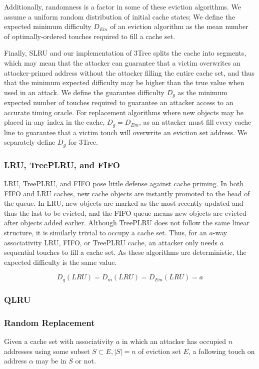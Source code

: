 \documentclass[sigconf, screen, review]{acmart}
\begin{document}
Additionally, randomness is a factor in some of these eviction algorithms.
We assume a uniform random distribution of initial cache states;
We define the expected minimum difficulty $D_{Em}$ of an eviction algorithm
as the mean number of optimally-ordered touches required to fill a cache set.

Finally, SLRU and our implementation of 3Tree splits the cache into segments,
which may mean that the attacker can guarantee that a victim overwrites
an attacker-primed address without the attacker filling the entire cache set,
and thus that the minimum expected difficulty may be higher than the true value
when used in an attack.
We define the guarantee difficulty $D_g$ as the minimum expected number of touches
required to guarantee an attacker access to an accurate timing oracle.
For replacement algorithms where new objects may be placed in any index in the cache,
$D_g = D_{Em}$, as an attacker must fill every cache line to guarantee
that a victim touch will overwrite an eviction set address.
We separately define $D_g$ for 3Tree.


\subsubsection{LRU, TreePLRU, and FIFO}
LRU, TreePLRU, and FIFO pose little defense against cache priming.
In both FIFO and LRU caches, new cache objects are instantly promoted to the head of the queue.
In LRU, new objects are marked as the most recently updated and thus the last to be evicted,
and the FIFO queue means new objects are evicted after objects added earlier.
Although TreePLRU does not follow the same linear structure,
it is similarly trivial to occupy a cache set.
Thus, for an $a$-way associativity LRU, FIFO, or TreePLRU cache, an attacker only needs
$a$ sequential touches to fill a cache set.
As these algorithms are deterministic, the expected difficulty is the same value.

\begin{equation}\label{LRUExpectedD}
  D_g(LRU) = D_{m}(LRU) = D_{Em}(LRU) = a
\end{equation}

\subsubsection{QLRU}

\subsubsection{Random Replacement}
Given a cache set with associativity $a$ in which an attacker has occupied $n$ addresses
using some subset $S \subset E, |S| = n$ of eviction set $E$,
a following touch on address $\alpha$ may be in $S$ or not.
\end{document}
